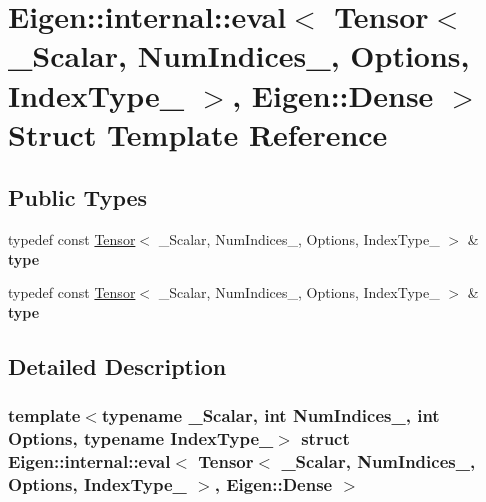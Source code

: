 \hypertarget{struct_eigen_1_1internal_1_1eval_3_01_tensor_3_01___scalar_00_01_num_indices___00_01_options_00_e6e8e1d1010612a3ca2530d1fede28ca}{}\section{Eigen\+:\+:internal\+:\+:eval$<$ Tensor$<$ \+\_\+\+Scalar, Num\+Indices\+\_\+, Options, Index\+Type\+\_\+ $>$, Eigen\+:\+:Dense $>$ Struct Template Reference}
\label{struct_eigen_1_1internal_1_1eval_3_01_tensor_3_01___scalar_00_01_num_indices___00_01_options_00_e6e8e1d1010612a3ca2530d1fede28ca}
\subsection*{Public Types}
\begin{DoxyCompactItemize}
\item 
\mbox{\label{struct_eigen_1_1internal_1_1eval_3_01_tensor_3_01___scalar_00_01_num_indices___00_01_options_00_e6e8e1d1010612a3ca2530d1fede28ca_a9f690b86355fc6e348dab3f0e6d2b7d1}} 
typedef const \hyperlink{class_eigen_1_1_tensor}{Tensor}$<$ \+\_\+\+Scalar, Num\+Indices\+\_\+, Options, Index\+Type\+\_\+ $>$ \& {\bfseries type}
\item 
\mbox{\label{struct_eigen_1_1internal_1_1eval_3_01_tensor_3_01___scalar_00_01_num_indices___00_01_options_00_e6e8e1d1010612a3ca2530d1fede28ca_a9f690b86355fc6e348dab3f0e6d2b7d1}} 
typedef const \hyperlink{class_eigen_1_1_tensor}{Tensor}$<$ \+\_\+\+Scalar, Num\+Indices\+\_\+, Options, Index\+Type\+\_\+ $>$ \& {\bfseries type}
\end{DoxyCompactItemize}


\subsection{Detailed Description}
\subsubsection*{template$<$typename \+\_\+\+Scalar, int Num\+Indices\+\_\+, int Options, typename Index\+Type\+\_\+$>$\newline
struct Eigen\+::internal\+::eval$<$ Tensor$<$ \+\_\+\+Scalar, Num\+Indices\+\_\+, Options, Index\+Type\+\_\+ $>$, Eigen\+::\+Dense $>$}



